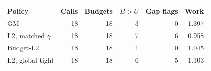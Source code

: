 \begin{tabular}{lrrrrr}
\toprule
Policy & Calls & Budgets & $B>U$ & Gap flags & Work\\
\midrule
GM & 18 & 18 & 3 & 0 & 1.397\\
L2, matched $\gamma$ & 18 & 18 & 7 & 6 & 0.958\\
Budget-L2 & 18 & 18 & 1 & 0 & 1.045\\
L2, global tight & 18 & 18 & 6 & 5 & 1.103\\
\bottomrule
\end{tabular}
